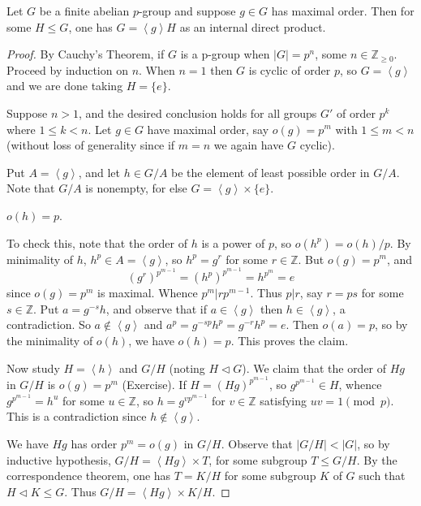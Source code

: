 \begin{lemma}
	Let $G$ be a finite abelian $p$-group and suppose $g \in G$ has maximal order. Then for some $H \le G$, one has $G = \left\langle g \right\rangle H$ as an internal direct product.
\end{lemma}
\begin{proof}
	By Cauchy's Theorem, if $G$ is a p-group when $|G| = p^n$, some $n \in \mathbb{Z}_{\ge 0}$. Proceed by induction on $n$. When $n =1$ then  $G$ is cyclic of order $p$, so $G = \left\langle g \right\rangle $ and we are done taking $H = \{e\} $.

	Suppose $n>1$, and the desired conclusion holds for all groups $G' $ of order $p^k$ where $1\le k<n$. Let $g \in G$ have maximal order, say $o(g) = p^m$ with $1\le m < n$ (without loss of generality since if $m = n$ we again have $G$ cyclic). 

	Put $A = \left\langle g \right\rangle $, and let $h \in G / A$ be the element of least possible order in  $G / A$. Note that $G / A$ is nonempty, for else $G = \left\langle g \right\rangle \times \{e\} $.
	\begin{claim}
		$o(h) = p$.
	\end{claim}
	To check this, note that the order of $h$ is a power of $p$, so $o(h^p) = o(h) / p$. By minimality of $h$, $h^p \in A = \left\langle g \right\rangle $, so $h^p = g^r$ for some $r \in \mathbb{Z}$. But $o(g) = p^m$, and
	\[
		\left( g^r \right) ^{p^{m-1}} = \left( h^p \right) ^{p^{m-1}} = h^{p^m} = e
	\] 
	since $o(g) = p^m$ is maximal. Whence $p^m | r p^{m-1}$. Thus $p | r$, say $r = ps $ for some $s \in \mathbb{Z}$.
	Put $a = g^{-s} h$, and observe that if $a \in \left\langle g \right\rangle $ then $h \in \left\langle g \right\rangle $, a contradiction. So $a \not\in \left\langle g \right\rangle $ and $a^p = g^{-sp}h^p = g^{-r}h^p = e$.  Then $o(a) = p$, so by the minimality of  $o(h)$, we have $o(h) = p$. This proves the claim.

	Now study $H = \left\langle h \right\rangle $ and $G / H$ (noting $H \triangleleft G$). We claim that the order of $Hg$ in $G / H$ is $o(g) = p^m$ (Exercise). If $H = \left( Hg \right) ^{p^{m-1}}$, so $g^{p^{m-1}} \in H$, whence $g^{p^{m-1}} = h^u$ for some  $u \in \mathbb{Z}$, so $h= g^{v p ^{m-1}}$ for $v \in \mathbb{Z}$ satisfying $uv = 1 \pmod p$. This is  a contradiction since $h \not\in  \left\langle g \right\rangle $.

	We have $Hg$ has order $p^m = o(g)$ in $G / H$. Observe that $| G / H| < |G|$, so by inductive hypothesis, $G / H = \left\langle H g \right\rangle \times T$, for some subgroup $T \le G / H$. By the correspondence theorem, one has $T = K / H$ for some subgroup $K$ of  $G$ such that $H \triangleleft K \le G$. Thus $G / H = \left\langle H g \right\rangle \times K / H$.


\end{proof}
